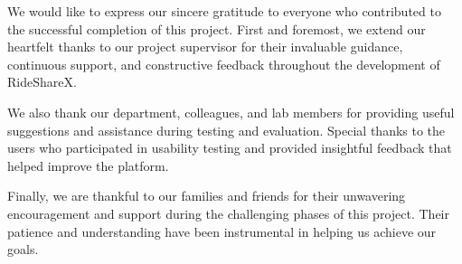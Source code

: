 We would like to express our sincere gratitude to everyone who contributed to the successful completion of this project. First and foremost, we extend our heartfelt thanks to our project supervisor for their invaluable guidance, continuous support, and constructive feedback throughout the development of RideShareX.

We also thank our department, colleagues, and lab members for providing useful suggestions and assistance during testing and evaluation. Special thanks to the users who participated in usability testing and provided insightful feedback that helped improve the platform.

Finally, we are thankful to our families and friends for their unwavering encouragement and support during the challenging phases of this project. Their patience and understanding have been instrumental in helping us achieve our goals.
